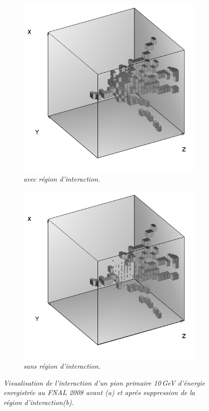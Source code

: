 \begin{figure}
	\centering
	\begin{subfigure}{0.5\textwidth}
		\centering
		\includegraphics[width=.90\linewidth]{ECAL/graphics/before.png}
		\caption{\label{fig:beforeF} \sl avec région d'interaction.}
	\end{subfigure}%
	\begin{subfigure}{0.5\textwidth}
		\centering
		\includegraphics[width=.90\linewidth]{ECAL/graphics/after2.png}
		\caption{\label{fig:afterF} \sl sans région d'interaction.}
	\end{subfigure}
	\caption{ \sl Visualisation de l'interaction d'un pion primaire 10\,GeV d'\'energie enregistrée au FNAL 2008 avant \textit{(a)} et apr\'es suppression de la région d'interaction\textit{(b)}. }
	\label{fig:testF}
\end{figure}


